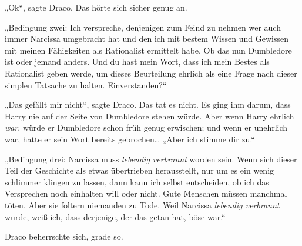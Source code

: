 „Ok“, sagte Draco. Das hörte sich sicher genug an.

„Bedingung zwei: Ich verspreche, denjenigen zum Feind zu nehmen wer auch immer Narcissa umgebracht hat und den ich mit bestem Wissen und Gewissen mit meinen Fähigkeiten als Rationalist ermittelt habe. Ob das nun Dumbledore ist oder jemand anders. Und du hast mein Wort, dass ich mein Bestes als Rationalist geben werde, um dieses Beurteilung ehrlich als eine Frage nach dieser simplen Tatsache zu halten. Einverstanden?“

„Das gefällt mir nicht“, sagte Draco. Das tat es nicht. Es ging ihm darum, dass Harry nie auf der Seite von Dumbledore stehen würde. Aber wenn Harry ehrlich \emph{war}, würde er Dumbledore schon früh genug erwischen; und wenn er unehrlich war, hatte er sein Wort bereits gebrochen… „Aber ich stimme dir zu.“

„Bedingung drei: Narcissa muss \emph{lebendig verbrannt} worden sein. Wenn sich dieser Teil der Geschichte als etwas übertrieben herausstellt, nur um es ein wenig schlimmer klingen zu lassen, dann kann ich selbst entscheiden, ob ich das Versprechen noch einhalten will oder nicht. Gute Menschen müssen manchmal töten. Aber sie foltern niemanden zu Tode. Weil Narcissa \emph{lebendig verbrannt} wurde, weiß ich, dass derjenige, der das getan hat, böse war.“

Draco beherrschte sich, grade so.

